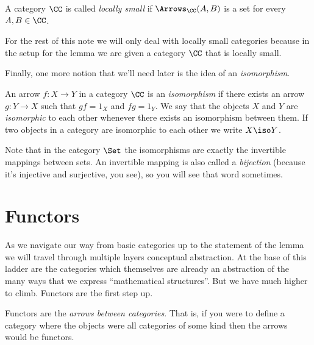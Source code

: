 \begin{defn}
A category $\CC$ is called {\it locally small} if $\Arrows_{\CC}(A,B)$ is a set for every
$A, B \in \CC$. \end{defn}%
\noindent
For the rest of this note we will only deal with locally small categories because in the
setup for the lemma we are given a category $\CC$ that is locally small.

Finally, one more notion that we'll need later is the idea of an {\it isomorphism}.

\begin{defn}
An arrow $f: X \to Y$ in a category $\CC$ is an {\it isomorphism} if there exists an arrow
$g: Y \to X$ such that $gf = 1_X$ and $fg = 1_Y$. We say that the objects $X$ and $Y$ are
{\it isomorphic} to each other whenever there exists an isomorphism between them. If two
objects in a category are isomorphic to each other we write $X \iso Y$.
\end{defn}
\noindent
Note that in the category $\Set$ the isomorphisms are exactly the invertible mappings
between sets. An invertible mapping is also called a {\it bijection} (because it's
injective and surjective, you see), so you will see that word sometimes.

\section{Functors}

As we navigate our way from basic categories up to the statement of the lemma we will
travel through multiple layers conceptual abstraction. At the base of this ladder
are the categories which themselves are already an abstraction of the many  ways
that we express ``mathematical structures''. But we have much higher to climb.
Functors are the first step up.

Functors are the {\it arrows between categories}. That is, if you were to define a
category where the objects were all categories of some kind then the arrows would be
functors.

